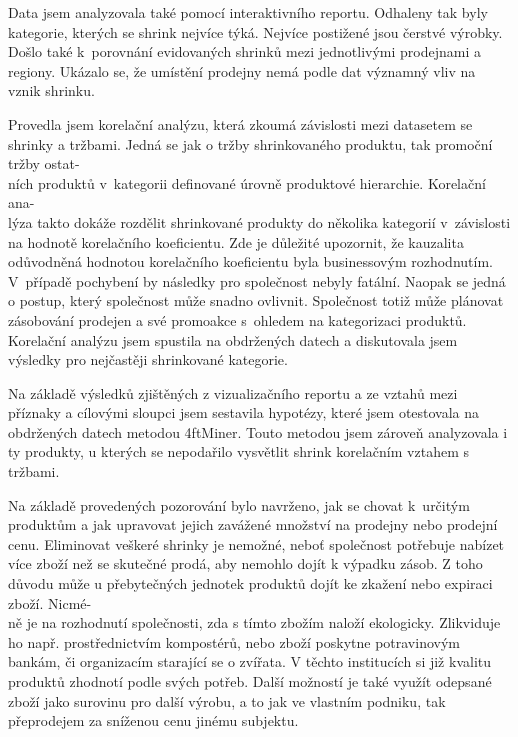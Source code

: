 Data jsem analyzovala také pomocí interaktivního reportu. Odhaleny tak byly kategorie, kterých se shrink nejvíce týká. Nejvíce postižené jsou čerstvé výrobky. Došlo také k~porovnání evidovaných shrinků mezi jednotlivými prodejnami a regiony. Ukázalo se, že umístění prodejny nemá podle dat významný vliv na vznik shrinku. 


Provedla jsem korelační analýzu, která zkoumá závislosti mezi datasetem se shrinky a tržbami. Jedná se jak o tržby shrinkovaného produktu, tak promoční tržby ostat-\\ních produktů v~kategorii definované úrovně produktové hierarchie. Korelační ana-\\lýza takto dokáže rozdělit shrinkované produkty do několika kategorií v~závislosti na hodnotě korelačního koeficientu. Zde je důležité upozornit, že kauzalita odůvodněná hodnotou korelačního koeficientu byla businessovým rozhodnutím. V~případě pochybení by následky pro společnost nebyly fatální. Naopak se jedná o postup, který společnost může snadno ovlivnit. Společnost totiž může plánovat zásobování prodejen a své promoakce s~ohledem na kategorizaci produktů.
Korelační analýzu jsem spustila na obdržených datech a diskutovala jsem výsledky pro nejčastěji shrinkované kategorie.

Na základě výsledků zjištěných z vizualizačního reportu a ze vztahů mezi příznaky a cílovými sloupci jsem sestavila hypotézy, které jsem otestovala na obdržených datech metodou 4ftMiner. Touto metodou jsem zároveň analyzovala i ty produkty, u kterých se nepodařilo vysvětlit shrink korelačním vztahem s tržbami.

Na základě provedených pozorování bylo navrženo, jak se chovat k~určitým produktům a jak upravovat jejich zavážené množství na prodejny nebo prodejní cenu. Eliminovat veškeré shrinky je nemožné, neboť společnost potřebuje nabízet více zboží než se skutečné prodá, aby nemohlo dojít k výpadku zásob. Z toho důvodu může u přebytečných jednotek produktů dojít ke zkažení nebo expiraci zboží. Nicmé-\\ně je na rozhodnutí společnosti, zda s tímto zbožím naloží ekologicky. Zlikviduje ho např. prostřednictvím kompostérů, nebo zboží poskytne potravinovým bankám, či organizacím starající se o zvířata. V těchto institucích si již kvalitu produktů zhodnotí podle svých potřeb. Další možností je také využít odepsané zboží jako surovinu pro další výrobu, a to jak ve vlastním podniku, tak přeprodejem za sníženou cenu jinému subjektu.

